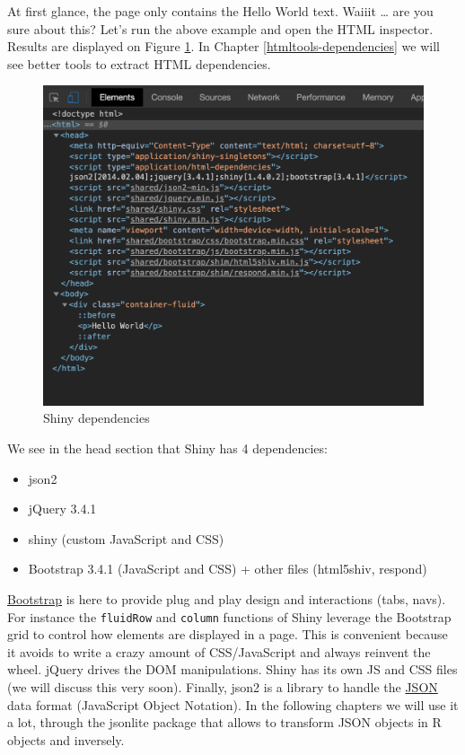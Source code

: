 \documentclass[]{book}
\providecommand{\tightlist}{%
  \setlength{\itemsep}{0pt}\setlength{\parskip}{0pt}}
\begin{document}
At first glance, the page only contains the Hello World text. Waiiit \ldots{} are you sure about this? Let's run the above example and open the HTML inspector. Results are displayed on Figure \ref{fig:shiny-deps}. In Chapter \ref{htmltools-dependencies} we will see better tools to extract HTML dependencies.

\begin{figure}
\includegraphics[width=14.92in]{images/survival-kit/shiny-deps} \caption{Shiny dependencies}\label{fig:shiny-deps}
\end{figure}

We see in the head section that Shiny has 4 dependencies:

\begin{itemize}
\tightlist
\item
  json2
\item
  jQuery 3.4.1
\item
  shiny (custom JavaScript and CSS)
\item
  Bootstrap 3.4.1 (JavaScript and CSS) + other files (html5shiv, respond)
\end{itemize}

\href{https://getbootstrap.com}{Bootstrap} is here to provide plug and play design and interactions (tabs, navs). For instance the \texttt{fluidRow} and \texttt{column} functions of Shiny leverage the Bootstrap grid to control how elements are displayed in a page. This is convenient because it avoids to write a crazy amount of CSS/JavaScript and always reinvent the wheel. jQuery drives the DOM manipulations. Shiny has its own JS and CSS files (we will discuss this very soon). Finally, json2 is a library to handle the \href{https://www.json.org/json-en.html}{JSON} data format (JavaScript Object Notation). In the following chapters we will use it a lot, through the jsonlite package that allows to transform JSON objects in R objects and inversely.
\end{document}
